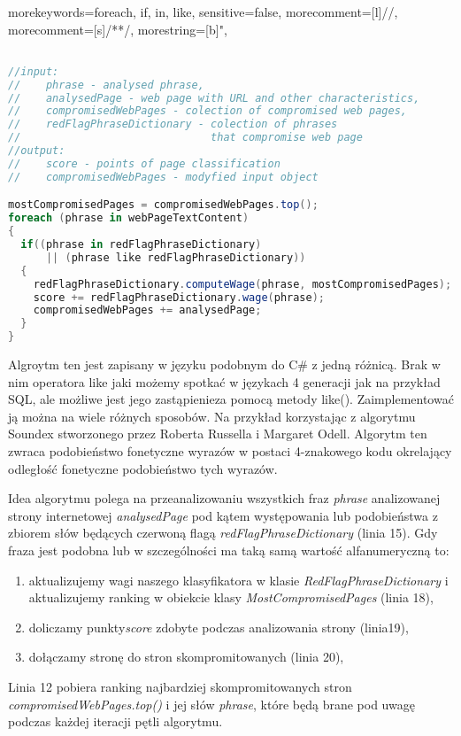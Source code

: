 \documentclass[9pt,twoside,a4paper]{article}
\begin{document}
%
 {morekeywords={foreach, if, in, like}, sensitive=false, morecomment=[l]{//}, morecomment=[s]{/*}{*/}, morestring=[b]", }
\lstset{
numbers=left, numberstyle=\tiny, stepnumber=1, numbersep=5pt
}
\begin{lstlisting}[title={Alg 1. Podstawowy algorytm klasyfikacji stron internetowych}, language=csharp, label=alg1] 

//input: 
//    phrase - analysed phrase, 
//    analysedPage - web page with URL and other characteristics, 
//    compromisedWebPages - colection of compromised web pages, 
//    redFlagPhraseDictionary - colection of phrases 
//                              that compromise web page
//output:
//    score - points of page classification
//    compromisedWebPages - modyfied input object

mostCompromisedPages = compromisedWebPages.top();
foreach (phrase in webPageTextContent)
{  
  if((phrase in redFlagPhraseDictionary) 
      || (phrase like redFlagPhraseDictionary))
  {
    redFlagPhraseDictionary.computeWage(phrase, mostCompromisedPages);
    score += redFlagPhraseDictionary.wage(phrase);
    compromisedWebPages += analysedPage;
  }
}
\end{lstlisting}


Algroytm ten jest zapisany w języku podobnym do C\# z jedną różnicą. Brak w nim operatora like jaki możemy spotkać w językach 4 generacji jak na przykład SQL, ale możliwe jest jego zastąpienieza pomocą metody like(). Zaimplementować ją można na wiele różnych sposobów. Na przykład korzystając z algorytmu Soundex stworzonego przez Roberta Russella i Margaret Odell\cite{donald_e._knuth_art_2002}. Algorytm ten zwraca podobieństwo fonetyczne wyrazów w postaci 4-znakowego kodu okrelający odległość fonetyczne podobieństwo tych wyrazów.

Idea algorytmu polega na przeanalizowaniu wszystkich fraz \textit{phrase} analizowanej strony internetowej \textit{analysedPage} pod kątem występowania lub podobieństwa z zbiorem słów będących czerwoną flagą \textit{redFlagPhraseDictionary} (linia 15). Gdy fraza jest podobna lub w szczególności ma taką samą wartość alfanumeryczną to:
\begin{enumerate}
\item aktualizujemy wagi naszego klasyfikatora w klasie \textit{RedFlagPhraseDictionary} i aktualizujemy ranking w obiekcie klasy \textit{MostCompromisedPages} (linia 18),
\item doliczamy punkty\textit{score} zdobyte podczas analizowania strony (linia19),
\item dołączamy stronę do stron skompromitowanych (linia 20),
\end{enumerate}
Linia 12 pobiera ranking najbardziej skompromitowanych stron \textit{compromisedWebPages.top()} i jej słów \textit{phrase}, które będą brane pod uwagę podczas każdej iteracji pętli algorytmu.
\end{document}
